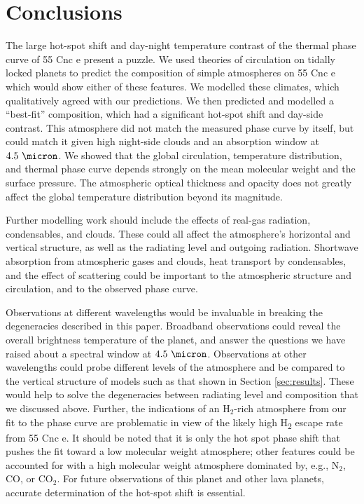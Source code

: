 







\section{Conclusions}


The large hot-spot shift and day-night temperature contrast of the thermal phase curve of 55 Cnc e present a puzzle. We used theories of circulation on tidally locked planets to predict the composition of simple atmospheres on 55 Cnc e which would show either of these features. We modelled these climates, which qualitatively agreed with our predictions. We then predicted and modelled a ``best-fit'' composition, which had a significant hot-spot shift and day-side contrast. This atmosphere did not match the measured phase curve by itself, but could match it given high night-side clouds and an absorption window at $4.5\ \micron$. We showed that the global circulation, temperature distribution, and thermal phase curve depends strongly on the mean molecular weight and the surface pressure. The atmospheric optical thickness and opacity does not greatly affect the global temperature distribution beyond its magnitude.

Further modelling work should include the effects of real-gas radiation, condensables, and clouds. These could all affect the atmosphere's horizontal and vertical structure, as well as the radiating level and outgoing radiation. Shortwave absorption from atmospheric gases and clouds, heat transport by condensables, and the effect of scattering could be important to the atmospheric structure and circulation, and to the observed phase curve.

Observations at different wavelengths would be invaluable in breaking the degeneracies described in this paper. Broadband observations could reveal the overall brightness temperature of the planet, and answer the questions we have raised about a spectral window at $4.5\ \micron$. Observations at other wavelengths could probe different levels of the atmosphere and be compared to the vertical structure of models such as that shown in Section \ref{sec:results}. These would help to solve the degeneracies between radiating level and composition that we discussed above. Further, the indications of an $\mathrm{H_2}$-rich atmosphere from our fit to the phase curve are problematic in view of the likely high H\textsubscript{2} escape rate from 55 Cnc e.  It should be noted that it is only the hot spot phase shift that pushes the fit toward a low molecular weight atmosphere; other features could be accounted for with a high molecular weight atmosphere dominated by, e.g., $\mathrm{N_2}$, $\mathrm{CO}$, or $\mathrm{CO_2}$. For future observations of this planet and other lava planets, accurate determination of the hot-spot shift is essential.


